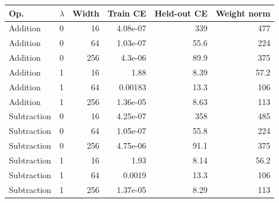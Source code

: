 \begin{tabular}{llrrrr}
\toprule
Op. & $\lambda$ & Width & Train CE & Held-out CE & Weight norm \\
\midrule
Addition & 0 & 16 & 4.08e-07 & 339 & 477 \\
Addition & 0 & 64 & 1.03e-07 & 55.6 & 224 \\
Addition & 0 & 256 & 4.3e-06 & 89.9 & 375 \\
Addition & 1 & 16 & 1.88 & 8.39 & 57.2 \\
Addition & 1 & 64 & 0.00183 & 13.3 & 106 \\
Addition & 1 & 256 & 1.36e-05 & 8.63 & 113 \\
Subtraction & 0 & 16 & 4.25e-07 & 358 & 485 \\
Subtraction & 0 & 64 & 1.05e-07 & 55.8 & 224 \\
Subtraction & 0 & 256 & 4.75e-06 & 91.1 & 375 \\
Subtraction & 1 & 16 & 1.93 & 8.14 & 56.2 \\
Subtraction & 1 & 64 & 0.0019 & 13.3 & 106 \\
Subtraction & 1 & 256 & 1.37e-05 & 8.29 & 113 \\
\bottomrule
\end{tabular}
